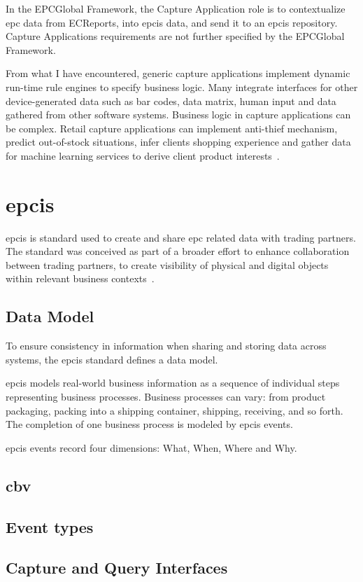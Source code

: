 In the EPCGlobal Framework, the Capture Application role is to contextualize \ac{epc} data from ECReports, into \ac{epcis} data, and send it to an \ac{epcis} repository.
Capture Applications requirements are not further specified by the EPCGlobal Framework.

From what I have encountered, generic capture applications implement dynamic run-time rule engines to specify business logic.
Many integrate interfaces for other device-generated data such as bar codes, data matrix, human input and data gathered from other software systems.
Business logic in capture applications can be complex. Retail capture applications can implement anti-thief mechanism, predict out-of-stock situations, infer clients shopping experience and gather data for machine learning services to derive client product interests~\cite{RFIDRetailKey}.

\section{\acf{epcis}}


\ac{epcis} is standard used to create and share \ac{epc} related data with trading partners.
The standard was conceived as part of a broader effort to enhance collaboration between trading partners, to create visibility of physical and digital objects within relevant business contexts~\cite{EPCISGuidelines}.

\subsection{Data Model}

To ensure consistency in information when sharing and storing data across systems, the \ac{epcis} standard defines a data model.

\ac{epcis} models real-world business information as a sequence of individual steps representing business processes.
Business processes can vary: from product packaging, packing into a shipping container, shipping, receiving, and so forth.
The completion of one business process is modeled by \ac{epcis} events.

\ac{epcis} events record four dimensions: What, When, Where and Why.







\subsection{\acf{cbv}}

\subsection{Event types}

\subsection{Capture and Query Interfaces}



\cleardoublepage